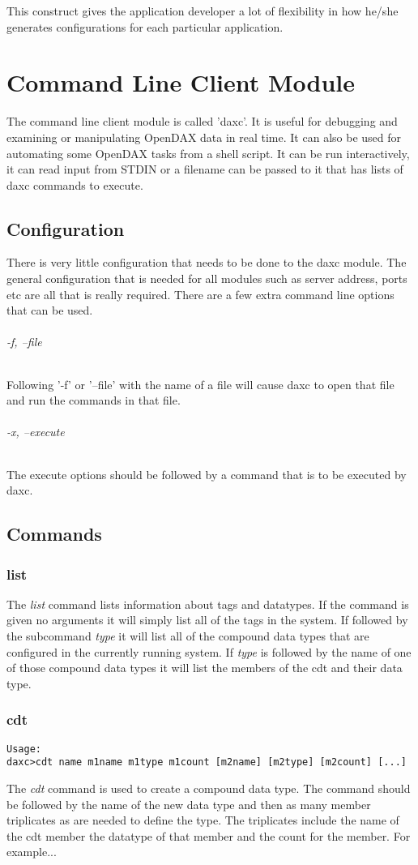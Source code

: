 This construct gives the application developer a lot of flexibility in how he/she generates configurations for each particular application.

\chapter{Command Line Client Module}
The command line client module is called 'daxc'.  It is useful for debugging and examining or manipulating OpenDAX data in real time.  It can also be used for automating some OpenDAX tasks from a shell script.  It can be run interactively, it can read input from STDIN or a filename can be passed to it that has lists of daxc commands to execute.

\section{Configuration}
There is very little configuration that needs to be done to the daxc module.  The general configuration that is needed for all modules such as server address, ports etc are all that is really required.  There are a few extra command line options that can be used.

\subparagraph*{-f, --file}
Following '-f' or '--file' with the name of a file will cause daxc to open that file and run the commands in that file.

\subparagraph*{-x, --execute}
The execute options should be followed by a command that is to be executed by daxc.

\section{Commands}

\subsection{list}
The \textit{list} command lists information about tags and datatypes.  If the command is given no arguments it will simply list all of the tags in the system.  If followed by the subcommand \textit{type} it will list all of the compound data types that are configured in the currently running system.  If \textit{type} is followed by the name of one of those compound data types it will list the members of the cdt and their data type.

\subsection{cdt}
\begin{verbatim}
Usage:
daxc>cdt name m1name m1type m1count [m2name] [m2type] [m2count] [...]
\end{verbatim}
The \textit{cdt} command is used to create a compound data type.  The command should be followed by the name of the new data type and then as many member triplicates as are needed to define the type.  The triplicates include the name of the cdt member the datatype of that member and the count for the member.  For example...

